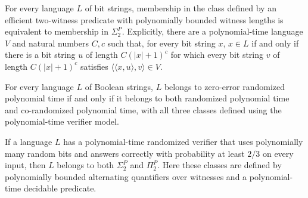 \begin{theorem}
\label{Randomized.inSigma2_polyTimeModel_iff}
\leanok
{}
For every language $L$ of bit strings, membership in the class defined by an efficient
two-witness predicate with polynomially bounded witness lengths is equivalent to
membership in $\Sigma_2^P$. Explicitly, there are a polynomial-time language $V$ and
natural numbers $C,c$ such that, for every bit string $x$, $x\in L$ if and only if there
is a bit string $u$ of length $C(|x|+1)^c$ for which every bit string $v$ of length
$C(|x|+1)^c$ satisfies $\langle\langle x,u\rangle,v\rangle\in V$.
\end{theorem}

\begin{theorem}
\label{Randomized.zpp_eq_rp_inter_corp_polyTime}
\leanok
{}
For every language $L$ of Boolean strings, $L$ belongs to zero-error randomized
polynomial time if and only if it belongs to both randomized polynomial time and
co-randomized polynomial time, with all three classes defined using the polynomial-time
verifier model.
\end{theorem}

\begin{theorem}
\label{Randomized.sipser_gacs_polyTime}
\leanok
{}
If a language $L$ has a polynomial-time randomized verifier that uses polynomially many
random bits and answers correctly with probability at least $2/3$ on every input, then
$L$ belongs to both $\Sigma_2^P$ and $\Pi_2^P$. Here these classes are defined by
polynomially bounded alternating quantifiers over witnesses and a polynomial-time
decidable predicate.
\end{theorem}
